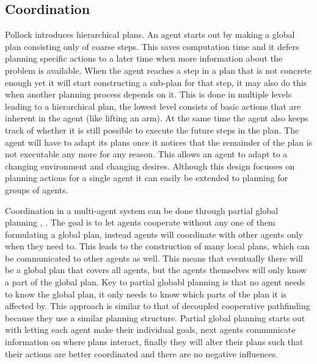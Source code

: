 \documentclass[a4paper]{article}
\begin{document}
\subsection{Coordination}
Pollock \cite{pollock1995} introduces hierarchical plans. An agent starts out
by  making a global plan consisting only of coarse steps. This saves
computation time and it defers planning specific actions to a later time when
more information about the problem is available. When the agent reaches a step
in a plan that is not concrete enough yet it will start constructing a sub-plan
for that step, it may also do this when another planning process depends on it.
This is done in multiple levels leading to a hierarchical plan, the lowest
level consists of basic actions that are inherent in the agent (like lifting an
arm). At the same time the agent also keeps track of whether it is still
possible to execute the future steps in the plan. The agent will have to adapt
its plans once it notices that the remainder of the plan is not executable any
more for any reason. This allows an agent to adapt to a changing environment
and changing desires. Although this design focusses on planning actions for a
single agent it can easily be extended to planning for groups of agents.

Coordination in a multi-agent system can be done through partial global
planning \cite[pp. 202--204]{woodridge2009}, \cite{durfee1991}. The goal is to
let agents cooperate without any
one of them formulating a global plan, instead agents will coordinate with
other agents only when they need to. This leads to the construction of many
local plans, which can be communicated to other agents as well. This means that
eventually there will be a global plan that covers all agents, but the agents
themselves will only know a part of the global plan. Key to partial globabl
planning is that no agent needs to know the global plan, it only needs to know
which parts of the plan it is affected by. This approach is similar
to that of decoupled cooperative pathfinding because they use a similar
planning structure. Partial global planning starts out with letting each agent
make their individual goals, next agents communicate information on where plans
interact, finally they will alter their plans such that their actions are
better coordinated and there are no negative influences.



\end{document}
